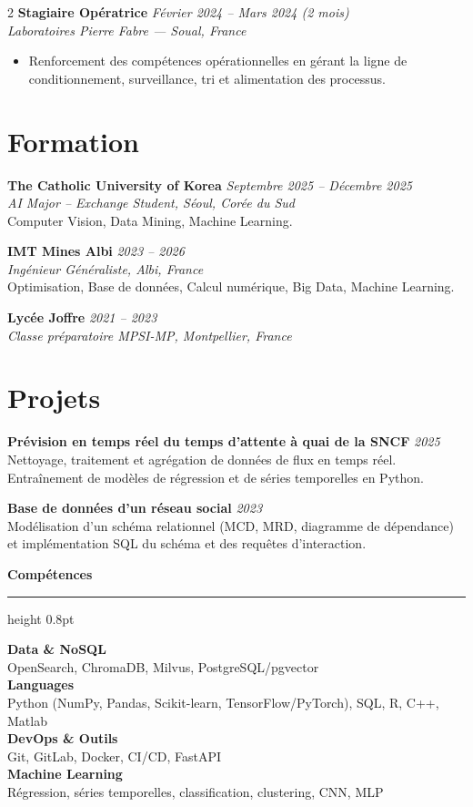 \documentclass[10.5pt,a4paper]{article}
\newcommand{\sectionrule}{\vspace{-6pt}{\color{accent}\hrule height 1pt}\vspace{2pt}}
\newcommand{\subsectitle}[1]{%
  {\color{accent}\bfseries\large #1}\\[-2pt]
  {\color{accent}\hrule height 0.8pt}\vspace{4pt}
}
\newcommand{\cvexp}[5]{%
  \noindent\textbf{#1} \hfill {\itshape\color{graytext}\small #4}\\
  {\itshape #2 --- #3}\\[-2pt]
  #5
  \vspace{5pt}
}
\newcommand{\cvedu}[5]{%
  \noindent\textbf{#1} \hfill {\itshape\color{graytext}\small #4}\\
  {\itshape #2, #3}\\[1pt]
  {\small #5}
  \vspace{2pt}
}
\newcommand{\cveduplain}[4]{%
  \noindent\textbf{#1} \hfill {\itshape\color{graytext}\small #4}\\
  {\itshape #2, #3}
  \vspace{2pt}
}
\newcommand{\cvproject}[3]{%
  \noindent\textbf{#1} \hfill {\itshape\color{graytext}\small #2}\\[1pt]
  {\small #3}
  \vspace{2pt}
}
\newcommand{\sidebarline}[2]{%
  \noindent\textbf{\small #1}\\
  {\small #2}\\[3pt]
}
\begin{document}
\begin{paracol}{2}
\cvexp{Stagiaire Opératrice}{Laboratoires Pierre Fabre}{Soual, France}{Février 2024 -- Mars 2024 (2 mois)}{%
  \begin{itemize}[leftmargin=12pt, itemsep=2pt, topsep=0pt, partopsep=0pt, parsep=0pt]
    \item Renforcement des compétences opérationnelles en gérant la ligne de conditionnement, surveillance, tri et alimentation des processus.
  \end{itemize}
}

\section*{Formation}
\sectionrule

\cvedu{The Catholic University of Korea}{AI Major -- Exchange Student}{Séoul, Corée du Sud}{Septembre 2025 -- Décembre 2025}{Computer Vision, Data Mining, Machine Learning.}

\cvedu{IMT Mines Albi}{Ingénieur Généraliste}{Albi, France}{2023 -- 2026}{Optimisation, Base de données, Calcul numérique, Big Data, Machine Learning.}

\cveduplain{Lycée Joffre}{Classe préparatoire MPSI-MP}{Montpellier, France}{2021 -- 2023}

\section*{Projets}
\sectionrule

\cvproject{Prévision en temps réel du temps d'attente à quai de la SNCF}{2025}{Nettoyage, traitement et agrégation de données de flux en temps réel. Entraînement de modèles de régression et de séries temporelles en Python.}

\cvproject{Base de données d'un réseau social}{2023}{Modélisation d'un schéma relationnel (MCD, MRD, diagramme de dépendance) et implémentation SQL du schéma et des requêtes d'interaction.}

\switchcolumn

\vspace{2pt}

\subsectitle{Compétences}

\sidebarline{Data \& NoSQL}{OpenSearch, ChromaDB, Milvus, PostgreSQL/\allowbreak pgvector}
\sidebarline{Languages}{Python (NumPy, Pandas, Scikit-learn, TensorFlow/\allowbreak PyTorch), SQL, R, C++, Matlab}
\sidebarline{DevOps \& Outils}{Git, GitLab, Docker, CI/CD, FastAPI}
\sidebarline{Machine Learning}{Régression, séries temporelles, classification, clustering, CNN, MLP}


\end{paracol}
\end{document}
